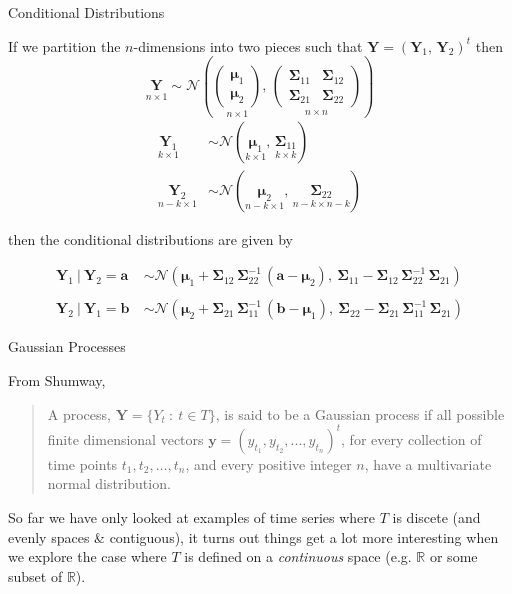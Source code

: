 \documentclass[11pt,ignorenonframetext,]{beamer}
\begin{document}
\begin{frame}[t]{Conditional Distributions}

If we partition the \(n\)-dimensions into two pieces such that
\(\bm{Y} = (\bm{Y}_1,\, \bm{Y}_2)^t\) then \footnotesize
\[
\underset{n \times 1}{\bm{Y}} \sim \mathcal{N}\left(
  \underset{n \times 1}{\begin{pmatrix}\bm{\mu}_1 \\ \bm{\mu}_2\end{pmatrix}},\, 
  \underset{n \times n}{\begin{pmatrix} 
    \bm{\Sigma}_{11} & \bm{\Sigma}_{12} \\ 
    \bm{\Sigma}_{21} & \bm{\Sigma}_{22} 
  \end{pmatrix}}
\right)
\] \[ \begin{aligned}
\underset{k \times 1}{\bm{Y}_1} &\sim \mathcal{N}(\underset{k \times 1}{\bm{\mu}_1},\, \underset{k \times k}{\bm{\Sigma}_{11}}) \\ 
\underset{n-k \times 1}{\bm{Y}_2} &\sim \mathcal{N}(\underset{n-k \times 1}{\bm{\mu}_2},\, \underset{n-k \times n-k}{\bm{\Sigma}_{22}})
\end{aligned} \]

\pause

\normalsize \vspace{2mm} then the conditional distributions are given by

\footnotesize
\[\begin{aligned}
\bm Y_1 ~|~ \bm{Y}_2 = \bm{a} ~&\sim \mathcal{N}(\bm\mu_1 + \bm\Sigma_{12} \, \bm\Sigma_{22}^{-1} \, (\bm{a} - \bm\mu_2),~ \bm\Sigma_{11}-\bm\Sigma_{12}\,\bm\Sigma_{22}^{-1} \, \bm\Sigma_{21}) \\
\\
\bm Y_2 ~|~ \bm{Y}_1 = \bm{b} ~&\sim \mathcal{N}(\bm\mu_2 + \bm\Sigma_{21} \, \bm\Sigma_{11}^{-1} \, (\bm{b} - \bm\mu_1),~ \bm\Sigma_{22}-\bm\Sigma_{21}\,\bm\Sigma_{11}^{-1} \, \bm\Sigma_{21})
\end{aligned}\]

\end{frame}

\begin{frame}[t]{Gaussian Processes}

From Shumway,

\begin{quote}
A process, \(\bm{Y} = \{Y_t ~:~ t \in T\}\), is said to be a Gaussian
process if all possible finite dimensional vectors
\(\bm{y} = (y_{t_1},y_{t_2},...,y_{t_n})^t\), for every collection of
time points \(t_1, t_2, \ldots , t_n\), and every positive integer
\(n\), have a multivariate normal distribution.
\end{quote}

\pause

So far we have only looked at examples of time series where \(T\) is
discete (and evenly spaces \& contiguous), it turns out things get a lot
more interesting when we explore the case where \(T\) is defined on a
\emph{continuous} space (e.g. \(\mathbb{R}\) or some subset of
\(\mathbb{R}\)).

\end{frame}
\end{document}

